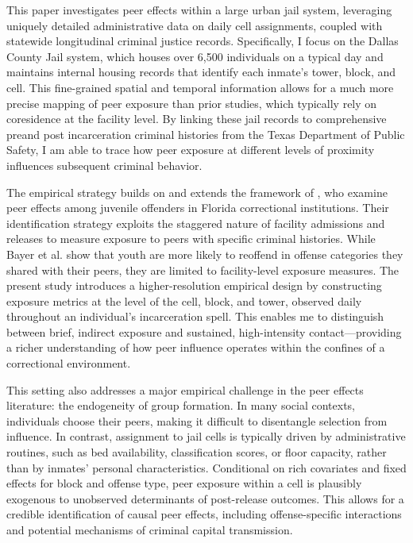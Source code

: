 \documentclass[12pt, a4paper]{article}
\begin{document}
\sloppy
This paper investigates peer effects within a large urban jail system, leveraging uniquely detailed administrative data on daily cell assignments, coupled with statewide longitudinal criminal justice records. Specifically, I focus on the Dallas County Jail system, which houses over 6,500 individuals on a typical day and maintains internal housing records that identify each inmate's tower, block, and cell. This fine-grained spatial and temporal information allows for a much more precise mapping of peer exposure than prior studies, which typically rely on coresidence at the facility level. By linking these jail records to comprehensive preand post incarceration criminal histories from the Texas Department of Public Safety, I am able to trace how peer exposure at different levels of proximity influences subsequent criminal behavior.

The empirical strategy builds on and extends the framework of \citet{bayer2009building}, who examine peer effects among juvenile offenders in Florida correctional institutions. Their identification strategy exploits the staggered nature of facility admissions and releases to measure exposure to peers with specific criminal histories. While Bayer et al. show that youth are more likely to reoffend in offense categories they shared with their peers, they are limited to facility-level exposure measures. The present study introduces a higher-resolution empirical design by constructing exposure metrics at the level of the cell, block, and tower, observed daily throughout an individual's incarceration spell. This enables me to distinguish between brief, indirect exposure and sustained, high-intensity contact—providing a richer understanding of how peer influence operates within the confines of a correctional environment.

This setting also addresses a major empirical challenge in the peer effects literature: the endogeneity of group formation. In many social contexts, individuals choose their peers, making it difficult to disentangle selection from influence. In contrast, assignment to jail cells is typically driven by administrative routines, such as bed availability, classification scores, or floor capacity, rather than by inmates' personal characteristics. Conditional on rich covariates and fixed effects for block and offense type, peer exposure within a cell is plausibly exogenous to unobserved determinants of post-release outcomes. This allows for a credible identification of causal peer effects, including offense-specific interactions and potential mechanisms of criminal capital transmission.
\end{document}
